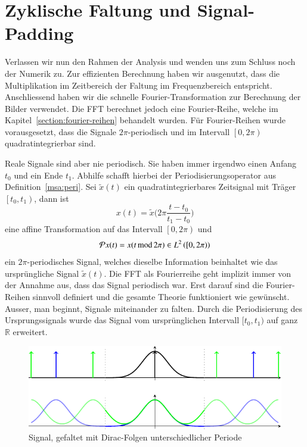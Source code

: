 \section{Zyklische Faltung und Signal-Padding}
\label{complex:circ-conv-padding}
Verlassen wir nun den Rahmen der Analysis und wenden uns zum Schluss noch der Numerik zu.
Zur effizienten Berechnung haben wir ausgenutzt, dass die Multiplikation im Zeitbereich der Faltung im Frequenzbereich entspricht.
Anschliessend haben wir die schnelle Fourier-Transformation zur Berechnung der Bilder verwendet.
Die FFT berechnet jedoch eine Fourier-Reihe, welche im Kapitel~\ref{section:fourier-reihen} behandelt wurden.
Für Fourier-Reihen wurde vorausgesetzt, dass die Signale $2\pi$-periodisch und im Intervall $\left[0, 2\pi\right)$ quadratintegrierbar sind.

Reale Signale sind aber nie periodisch.
Sie haben immer irgendwo einen Anfang $t_0$ und ein Ende $t_1$.
Abhilfe schafft hierbei der Periodisierungsoperator aus Definition~\ref{msa:peri}.
Sei $\tilde{x}(t)$ ein quadratintegrierbares Zeitsignal mit Träger $\left[t_0, t_1\right)$, dann ist
\[
	x(t) = \tilde{x}\biggl(2\pi\frac{t-t_0}{t_1-t_0}\biggr)
\]
eine affine Transformation auf das Intervall $\left[0, 2\pi \right)$ und
\[
	\Peri x(t) = x( t \,\text{mod}\, 2\pi) \in L^2\left(\left[0, 2\pi \right)\right)
\]
ein $2\pi$-periodisches Signal, welches dieselbe Information beinhaltet wie das ursprüngliche Signal $\tilde{x}(t)$.
Die FFT als Fourierreihe geht implizit immer von der Annahme aus, dass das Signal periodisch war.
Erst darauf sind die Fourier-Reihen sinnvoll definiert und die gesamte Theorie funktioniert wie gewünscht.
Ausser, man beginnt, Signale miteinander zu falten.
Durch die Periodisierung des Ursprungssignals wurde das Signal vom ursprünglichen Intervall $[t_0, t_1)$ auf ganz $\mathbb{R}$ erweitert.

\begin{figure}
	\centering
	\includegraphics{papers/complex/images/cyclic_conv.pdf}
	\caption{Signal, gefaltet mit Dirac-Folgen unterschiedlicher Periode}
	\label{complex:cyclic-conv}
\end{figure}

